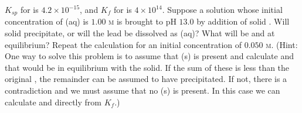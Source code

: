 \documentclass[12pt]{article}
\newenvironment{problem}[2][Problem]{\begin{trivlist}
\item[\hskip \labelsep {\bfseries #1}\hskip \labelsep {\bfseries #2.}]}{\end{trivlist}}
\begin{document}
\begin{problem}{16.47}
$K_{sp}$ for  is $4.2\times10^{-15}$, and $K_f$ for  is $4\times10^{14}$. Suppose a solution whose initial concentration of (aq) is $1.00$ \textsc{m} is brought to pH $13.0$ by addition of solid . Will solid  precipitate, or will the lead be dissolved as (aq)? What will be  and \ce{[Pb(OH)3^-]} at equilibrium? Repeat the calculation for an initial \ce{[Pb^{2+}]} concentration of $0.050$ \textsc{m}. (Hint: One way to solve this problem is to assume that (s) is present and calculate  and \ce{[Pb(OH)3^-]} that would be in equilibrium with the solid. If the sum of these is less than the original , the remainder can be assumed to have precipitated. If not, there is a contradiction and we must assume that no (s) is present. In this case we can calculate  and \ce{[Pb(OH)3^-]} directly from $K_f$.)
\end{problem}
\end{document}
